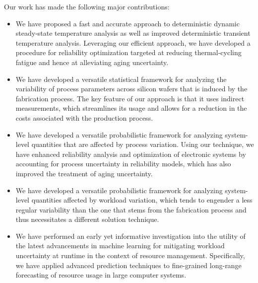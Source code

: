Our work has made the following major contributions:

\begin{itemize}

\item
We have proposed a fast and accurate approach to deterministic dynamic
steady-state temperature analysis as well as improved deterministic transient
temperature analysis. Leveraging our efficient approach, we have developed a
procedure for reliability optimization targeted at reducing thermal-cycling
fatigue and hence at alleviating aging uncertainty.

\item
We have developed a versatile statistical framework for analyzing the
variability of process parameters across silicon wafers that is induced by the
fabrication process. The key feature of our approach is that it uses indirect
measurements, which streamlines its usage and allows for a reduction in the
costs associated with the production process.

\item
We have developed a versatile probabilistic framework for analyzing system-level
quantities that are affected by process variation. Using our technique, we have
enhanced reliability analysis and optimization of electronic systems by
accounting for process uncertainty in reliability models, which has also
improved the treatment of aging uncertainty.

\item
We have developed a versatile probabilistic framework for analyzing system-level
quantities affected by workload variation, which tends to engender a less
regular variability than the one that stems from the fabrication process and
thus necessitates a different solution technique.

\item
We have performed an early yet informative investigation into the utility of the
latest advancements in machine learning for mitigating workload uncertainty at
runtime in the context of resource management. Specifically, we have applied
advanced prediction techniques to fine-grained long-range forecasting of
resource usage in large computer systems.

\end{itemize}

